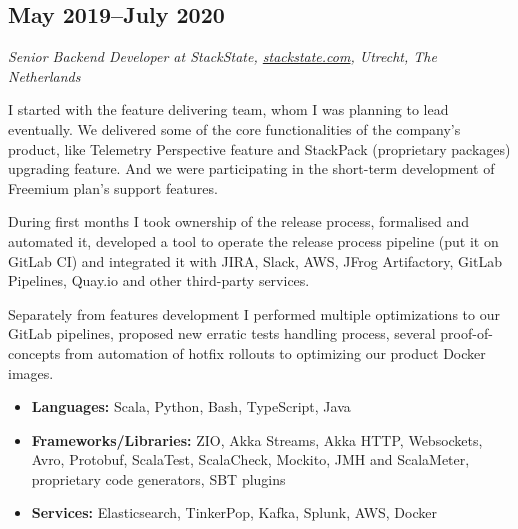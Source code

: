 \subsection*{May 2019--July 2020}

\textit{Senior Backend Developer at StackState,
\href{https://stackstate.com}{\url{stackstate.com}}, Utrecht, The
Netherlands}

I started with the feature delivering team, whom I was planning to
lead eventually. We delivered some of the core functionalities of the
company's product, like Telemetry Perspective feature and StackPack
(proprietary packages) upgrading feature. And we were participating in
the short-term development of Freemium plan's support features.

During first months I took ownership of the release process,
formalised and automated it, developed a tool to operate the release
process pipeline (put it on GitLab CI) and integrated it with JIRA,
Slack, AWS, JFrog Artifactory, GitLab Pipelines, Quay.io and other
third-party services.

Separately from features development I performed multiple
optimizations to our GitLab pipelines, proposed new erratic tests
handling process, several proof-of-concepts from automation of hotfix
rollouts to optimizing our product Docker images.

\begin{itemize}[noitemsep, nosep]
  \item \textbf{Languages:} Scala, Python, Bash, TypeScript, Java
  \item \textbf{Frameworks/Libraries:} ZIO, Akka Streams, Akka HTTP,
Websockets, Avro, Protobuf, ScalaTest, ScalaCheck, Mockito, JMH and
ScalaMeter, proprietary code generators, SBT plugins
  \item \textbf{Services:} Elasticsearch, TinkerPop, Kafka, Splunk,
AWS, Docker
\end{itemize}
